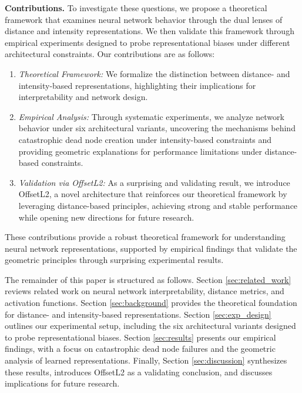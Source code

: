 \textbf{Contributions.} To investigate these questions, we propose a theoretical framework that examines neural network behavior through the dual lenses of distance and intensity representations. We then validate this framework through empirical experiments designed to probe representational biases under different architectural constraints. Our contributions are as follows:
\begin{enumerate}
    \item \textit{Theoretical Framework:} We formalize the distinction between distance- and intensity-based representations, highlighting their implications for interpretability and network design.
    \item \textit{Empirical Analysis:} Through systematic experiments, we analyze network behavior under six architectural variants, uncovering the mechanisms behind catastrophic dead node creation under intensity-based constraints and providing geometric explanations for performance limitations under distance-based constraints.
    \item \textit{Validation via OffsetL2:} As a surprising and validating result, we introduce OffsetL2, a novel architecture that reinforces our theoretical framework by leveraging distance-based principles, achieving strong and stable performance while opening new directions for future research.
\end{enumerate}

These contributions provide a robust theoretical framework for understanding neural network representations, supported by empirical findings that validate the geometric principles through surprising experimental results.

The remainder of this paper is structured as follows. Section \ref{sec:related_work} reviews related work on neural network interpretability, distance metrics, and activation functions. Section \ref{sec:background} provides the theoretical foundation for distance- and intensity-based representations. Section \ref{sec:exp_design} outlines our experimental setup, including the six architectural variants designed to probe representational biases. Section \ref{sec:results} presents our empirical findings, with a focus on catastrophic dead node failures and the geometric analysis of learned representations. Finally, Section \ref{sec:discussion} synthesizes these results, introduces OffsetL2 as a validating conclusion, and discusses implications for future research.
